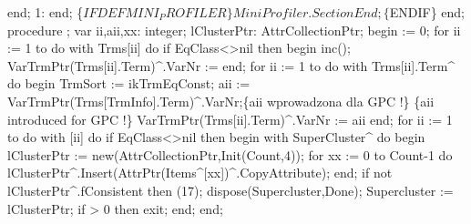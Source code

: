                      end;
            1:
         end;
   \{$IFDEF MINI_PROFILER\}
   MiniProfiler.SectionEnd;
   \{$ENDIF\}
end;
\eatline
{}\nwendcode{}\nwdocspar
\nwenddocs{}\endmoddef\nwstartdeflinemarkup\nwenddeflinemarkup
procedure ;
var
   ii,aii,xx: integer;
   lClusterPtr: AttrCollectionPtr;
begin
    := 0;
   for ii := 1 to  do
      with Trms[ii] do
         if  EqClass<>nil then
         begin
            inc();
            VarTrmPtr(Trms[ii].Term)^.VarNr := 
         end;
   for ii := 1 to  do
      with Trms[ii].Term^ do
   begin
      TrmSort := ikTrmEqConst;
      aii := VarTrmPtr(Trms[TrmInfo].Term)^.VarNr;\{aii wprowadzona dla GPC !\}
      \{aii introduced for GPC !\}
      VarTrmPtr(Trms[ii].Term)^.VarNr := aii
   end;
   for ii := 1 to  do
      with [ii] do
         if  EqClass<>nil then
         begin
            with SuperCluster^ do
            begin
               lClusterPtr := new(AttrCollectionPtr,Init(Count,4));
               for xx := 0 to Count-1 do
                  lClusterPtr^.Insert(AttrPtr(Items^[xx])^.CopyAttribute);
            end;
            if not lClusterPtr^.fConsistent then (17);
            dispose(Supercluster,Done);
            Supercluster := lClusterPtr;
            if  > 0 then exit;
         end;
end;
\eatline

